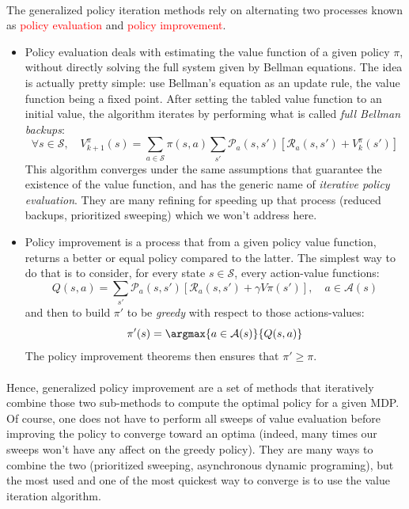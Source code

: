 \documentclass[a4paper]{report}
\begin{document}
{{{				\paragraph{} The generalized policy iteration methods rely on alternating two processes known as \textcolor{red}{policy evaluation} and \textcolor{red}{policy improvement}. 
				\begin{itemize}[label=$\triangleright$]
					\item Policy evaluation deals with estimating the value function of a given policy $\pi$, without directly solving the full system given by Bellman equations. The idea is actually pretty simple: use Bellman's equation as an update rule, the value function being a fixed point. After setting the tabled value function to an initial value, the algorithm iterates by performing what is called \emph{full Bellman backups}: 
					\begin{equation}
						\forall{s}\in\mathcal{S}, \quad V_{k+1}^\pi(s) = \sum_{a\in\mathcal{S}} \pi(s,a)\sum_{s'}\mathcal{P}_a(s,s') \left[\mathcal{R}_a(s,s')+V_k^\pi(s')\right]
					\end{equation}
					This algorithm converges under the same assumptions that guarantee the existence of the value function, and has the generic name of \emph{iterative policy evaluation}. They are many refining for speeding up that process (reduced backups, prioritized sweeping) which we won't address here. 
				\item Policy improvement is a process that from a given policy value function, returns a better or equal policy compared to the latter. The simplest way to do that is to consider, for every state $s\in\mathcal{S}$, every action-value functions: 
				\begin{equation}
					Q(s,a) = \sum_{s'}\mathcal{P}_a(s,s')\left[\mathcal{R}_a(s,s') + \gamma V\pi(s')\right], \quad a\in\mathcal{A}(s)
				\end{equation}
				and then to build $\pi'$ to be \emph{greedy} with respect to those actions-values: 
				\begin{equation}
					\pi'(s) = \argmax{a\in\mathcal{A}(s)}{Q(s,a)}
				\end{equation}
					The policy improvement theorems then ensures that $\pi'\geq \pi$. 
				\end{itemize}
				
				\paragraph{} Hence, generalized policy improvement are a set of methods that iteratively combine those two sub-methods to compute the optimal policy for a given MDP. Of course, one does not have to perform all sweeps of value evaluation before improving the policy to converge toward an optima (indeed, many times our sweeps won't have any affect on the greedy policy). They are many ways to combine the two (prioritized sweeping, asynchronous dynamic programing), but the most used and one of the most quickest way to converge is to use the value iteration algorithm. 
			}	
}}
\end{document}
